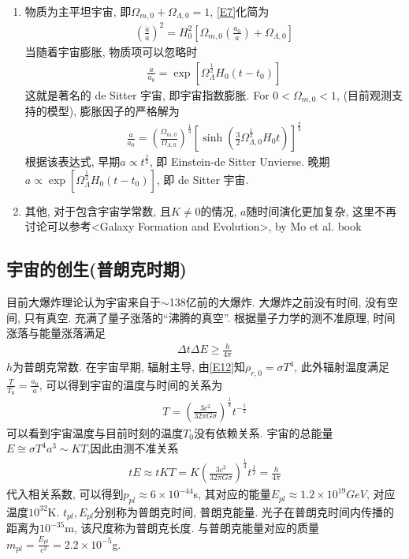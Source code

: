 \begin{enumerate}
\begin{enumerate}
    \end{enumerate}
    \item 物质为主平坦宇宙, 即$\Omega_{m, 0}+\Omega_{\Lambda, 0}=1$, \ref{E7}化简为
    \begin{align*}
        \left( \frac{\dot{a}}{a} \right)^2=H_0^2\left[ \Omega_{m,0}\left( \frac{a_0}{a} \right) +\Omega_{\Lambda, 0}\right]
    \end{align*}
    当随着宇宙膨胀, 物质项可以忽略时
    \begin{align*}
        \frac{a}{a_0}=\exp\left[ \Omega_\Lambda^{\frac{1}{2}}H_0(t-t_0) \right]
    \end{align*}
    这就是著名的 de Sitter 宇宙, 即宇宙指数膨胀. 
    \subitem For $0<\Omega_{m, 0}<1$, (目前观测支持的模型), 膨胀因子的严格解为
    \begin{align}
        \frac{a}{a_0}=\left( \frac{\Omega_{m, 0}}{\Omega_{\Lambda, 0}} \right)^{\frac{1}{3}}\left[ \sinh\left( \frac{3}{2}\Omega_{\Lambda, 0}^{\frac{1}{2}}H_0 t \right) \right]^{\frac{2}{3}}\label{E13}
    \end{align}
    根据该表达式, 早期$a\propto t^{\frac{2}{3}}$, 即 Einstein-de Sitter Unvierse. 晚期$a\propto\exp\left[ \Omega_\Lambda^{\frac{1}{2}}H_0(t-t_0) \right]$, 即 de Sitter 宇宙. 
    \item 其他, 对于包含宇宙学常数, 且$K\ne 0$的情况, $a$随时间演化更加复杂, 这里不再讨论可以参考<Galaxy Formation and Evolution>, by Mo et al. book
\end{enumerate}

\subsection{宇宙的创生(普朗克时期)}
目前大爆炸理论认为宇宙来自于$\sim$138亿前的大爆炸. 大爆炸之前没有时间, 没有空间, 只有真空. 充满了量子涨落的``沸腾的真空''. 根据量子力学的测不准原理, 时间涨落与能量涨落满足
\begin{align*}
    \Delta t\Delta E\ge \frac{h}{4\pi}
\end{align*}
$h$为普朗克常数. 在宇宙早期, 辐射主导, 由\ref{E12}知$\rho_{r, 0}=\sigma T^4$, 此外辐射温度满足$\frac{T}{T_0}=\frac{a_0}{a}$, 可以得到宇宙的温度与时间的关系为
\begin{align*}
    T=\left( \frac{3c^2}{32\pi G \sigma} \right)^{\frac{1}{4}}t^{-\frac{1}{2}}
\end{align*}
可以看到宇宙温度与目前时刻的温度$T_0$没有依赖关系. 宇宙的总能量$E\cong \sigma T^4 a^3\sim KT$,因此由测不准关系
\begin{align*}
    tE\approx tKT=K \left( \frac{3c^2}{32\pi G \sigma} \right)^{\frac{1}{4}}t^{\frac{1}{2}}=\frac{h}{4\pi}
\end{align*}
代入相关系数, 可以得到$p_{pl}\approx 6\times 10^{-44}$s, 其对应的能量$E_{pl}\approx 1.2\times 10^{19}GeV$, 对应温度$10^{32}$K. $t_{pl}, E_{pl}$分别称为普朗克时间, 普朗克能量. 光子在普朗克时间内传播的距离为$10^{-35}$m, 该尺度称为普朗克长度. 与普朗克能量对应的质量$m_{pl}=\frac{E_{pl}}{c^2}=2.2\times 10^{-5}$g. 

